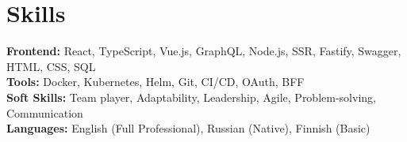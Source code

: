 \documentclass[a4paper,9pt]{article}
\begin{document}
\section{Skills}
\textbf{Frontend:} React, TypeScript, Vue.js, GraphQL, Node.js, SSR, Fastify, Swagger, HTML, CSS, SQL\\
\textbf{Tools:} Docker, Kubernetes, Helm, Git, CI/CD, OAuth, BFF\\
\textbf{Soft Skills:} Team player, Adaptability, Leadership, Agile, Problem-solving, Communication\\
\textbf{Languages:} English (Full Professional), Russian (Native), Finnish (Basic)
\end{document}
